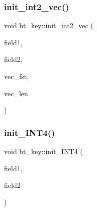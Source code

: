 \mbox{\label{classbt__key_ac387752908d0de9d69246e19a3ae321d}} 
\subsubsection{\texorpdfstring{init\+\_\+int2\+\_\+vec()}{init\_int2\_vec()}}
{\footnotesize\ttfamily void bt\+\_\+key\+::init\+\_\+int2\+\_\+vec (\begin{DoxyParamCaption}\item[{\mbox{\hyperlink{galois_8h_a09fddde158a3a20bd2dcadb609de11dc}{I\+NT}}}]{field1,  }\item[{\mbox{\hyperlink{galois_8h_a09fddde158a3a20bd2dcadb609de11dc}{I\+NT}}}]{field2,  }\item[{\mbox{\hyperlink{galois_8h_a09fddde158a3a20bd2dcadb609de11dc}{I\+NT}}}]{vec\+\_\+fst,  }\item[{\mbox{\hyperlink{galois_8h_a09fddde158a3a20bd2dcadb609de11dc}{I\+NT}}}]{vec\+\_\+len }\end{DoxyParamCaption})}

\mbox{\label{classbt__key_a1cc3e1aa6b3a6ec6e036fd4fee010564}} 
\subsubsection{\texorpdfstring{init\+\_\+\+I\+N\+T4()}{init\_INT4()}}
{\footnotesize\ttfamily void bt\+\_\+key\+::init\+\_\+\+I\+N\+T4 (\begin{DoxyParamCaption}\item[{\mbox{\hyperlink{galois_8h_a09fddde158a3a20bd2dcadb609de11dc}{I\+NT}}}]{field1,  }\item[{\mbox{\hyperlink{galois_8h_a09fddde158a3a20bd2dcadb609de11dc}{I\+NT}}}]{field2 }\end{DoxyParamCaption})}

\mbox{\label{classbt__key_ac13cd9d95f812eeb86c70219905f16fd}} 
